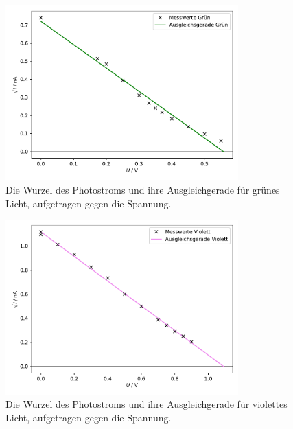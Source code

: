 \begin{figure}[H]
    \centering
    \includegraphics[width=0.8\textwidth]{build/plot_sqrt_gruen.pdf}
    \caption{Die Wurzel des Photostroms und ihre Ausgleichgerade für grünes Licht, aufgetragen gegen die Spannung.}
    \label{fig:plot_sqrt_gruen}
\end{figure}

\begin{figure}[H]
    \centering
    \includegraphics[width=0.8\textwidth]{build/plot_sqrt_violett.pdf}
    \caption{Die Wurzel des Photostroms und ihre Ausgleichgerade für violettes Licht, aufgetragen gegen die Spannung.}
    \label{fig:plot_sqrt_violett}
\end{figure}

